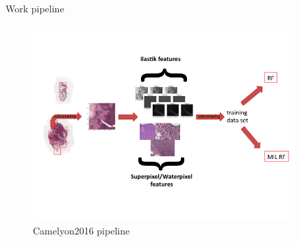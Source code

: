 \documentclass{beamer}
\begin{document}
\begin{frame}{Work pipeline}
\begin{figure}[!ht]
\centering
\includegraphics[width=0.9\textwidth]{workflow.png}
\caption{Camelyon2016 pipeline}
\label{Ol}
\end{figure}
\end{frame}
\end{document}
